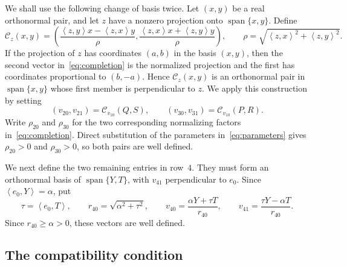 \documentclass[11pt]{article}
\theoremstyle{definition}
\newcommand{\spn}{\operatorname{span}}
\newcommand{\ip}[2]{\left\langle #1,#2\right\rangle}
\begin{document}
We shall use the following change of basis twice.  Let $(x,y)$ be a real
orthonormal pair, and let $z$ have a nonzero projection onto
$\spn\{x,y\}$.  Define
\begin{equation}\label{eq:completion}
\mathcal C_z(x,y)=
\left(
\frac{\ip{z}{y}x-\ip{z}{x}y}{\rho},
\frac{\ip{z}{x}x+\ip{z}{y}y}{\rho}
\right),
\qquad
\rho=\sqrt{\ip{z}{x}^2+\ip{z}{y}^2}.
\end{equation}
If the projection of $z$ has coordinates $(a,b)$ in the basis $(x,y)$, then
the second vector in~\eqref{eq:completion} is the normalized projection and
the first has coordinates proportional to $(b,-a)$.  Hence
$\mathcal C_z(x,y)$ is an orthonormal pair in $\spn\{x,y\}$ whose first
member is perpendicular to $z$.  We apply this construction by setting
\begin{equation}\label{eq:v2021v3031}
(v_{20},v_{21})=\mathcal C_{v_{10}}(Q,S),
\qquad
(v_{30},v_{31})=\mathcal C_{v_{10}}(P,R).
\end{equation}
Write $\rho_{20}$ and $\rho_{30}$ for the two corresponding normalizing
factors in~\eqref{eq:completion}.  Direct substitution of the parameters
in~\eqref{eq:parameters} gives $\rho_{20}>0$ and $\rho_{30}>0$, so both pairs
are well defined.

We next define the two remaining entries in row~$4$.  They must form an
orthonormal basis of $\spn\{Y,T\}$, with $v_{41}$ perpendicular to $e_0$.
Since $\ip{e_0}{Y}=\alpha$, put
\begin{equation}\label{eq:v4041}
\tau=\ip{e_0}{T},\qquad
r_{40}=\sqrt{\alpha^2+\tau^2},\qquad
v_{40}=\frac{\alpha Y+\tau T}{r_{40}},\qquad
v_{41}=\frac{\tau Y-\alpha T}{r_{40}}.
\end{equation}
Since $r_{40}\geq\alpha>0$, these vectors are well defined.

\subsection{The compatibility condition}
\end{document}
